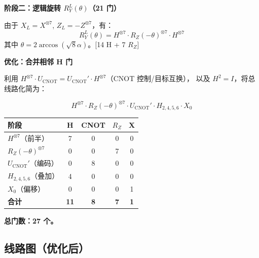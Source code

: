 \documentclass[12pt,a4paper]{ctexart}
\begin{document}
\noindent\textbf{阶段二：逻辑旋转 $R_Y^L(\theta)$（21 门）}

由于 $X_L = X^{\otimes 7}$, $Z_L = -Z^{\otimes 7}$，有：
\begin{equation*}
    R_Y^L(\theta) = H^{\otimes 7} \cdot R_Z(-\theta)^{\otimes 7} \cdot H^{\otimes 7}
\end{equation*}
其中 $\theta = 2\arccos(\sqrt{8}\alpha)$。\hfill[14 H + 7 $R_Z$]

\vspace{4pt}
\noindent\textbf{优化：合并相邻 H 门}

利用 $H^{\otimes 7} \cdot U_{\text{CNOT}} = U_{\text{CNOT}}' \cdot H^{\otimes 7}$（CNOT 控制/目标互换），
以及 $H^2 = I$，将总线路化简为：

\begin{equation*}
    \boxed{H^{\otimes 7} \cdot R_Z(-\theta)^{\otimes 7} \cdot U_{\text{CNOT}}' \cdot H_{2,4,5,6} \cdot X_0}
\end{equation*}

\begin{table}[h]
\centering
\begin{tabular}{lcccc}
\toprule
\textbf{阶段} & \textbf{H} & \textbf{CNOT} & \textbf{$R_Z$} & \textbf{X} \\
\midrule
$H^{\otimes 7}$（前半） & 7 & 0 & 0 & 0 \\
$R_Z(-\theta)^{\otimes 7}$ & 0 & 0 & 7 & 0 \\
$U_{\text{CNOT}}'$（编码） & 0 & 8 & 0 & 0 \\
$H_{2,4,5,6}$（叠加） & 4 & 0 & 0 & 0 \\
$X_0$（偏移） & 0 & 0 & 0 & 1 \\
\midrule
\textbf{合计} & \textbf{11} & \textbf{8} & \textbf{7} & \textbf{1} \\
\bottomrule
\end{tabular}
\end{table}

\textbf{总门数：27 个。}

\subsection*{线路图（优化后）}
\end{document}
